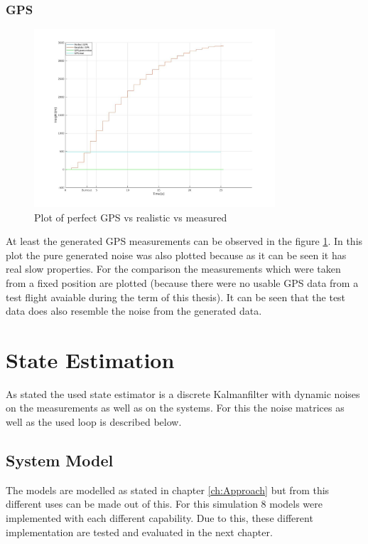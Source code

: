 \subsubsection{GPS}
\begin{figure}[h!]
 \centering
 \includegraphics[width=0.8\textwidth]{./Pictures/GPSPerfVSReal.jpg}
 \caption{Plot of perfect GPS vs realistic vs measured}
 \label{fig:GPSPerfVSReal}
\end{figure}
At least the generated GPS measurements can be observed in the figure \ref{fig:GPSPerfVSReal}.
In this plot the pure generated noise was also plotted because as it can be seen it has real slow properties.
For the comparison the measurements which were taken from a fixed position are plotted (because there were no usable GPS data from a test flight avaiable during the term of this thesis).
It can be seen that the test data does also resemble the noise from the generated data.


\section{State Estimation}
As stated the used state estimator is a discrete Kalmanfilter with dynamic noises on the measurements as well as on the systems.
For this the noise matrices as well as the used loop is described below.

\subsection{System Model}
The models are modelled as stated in chapter \ref{ch:Approach} but from this different uses can be made out of this.
For this simulation 8 models were implemented with each different capability.
Due to this, these different implementation are tested and evaluated in the next chapter.
